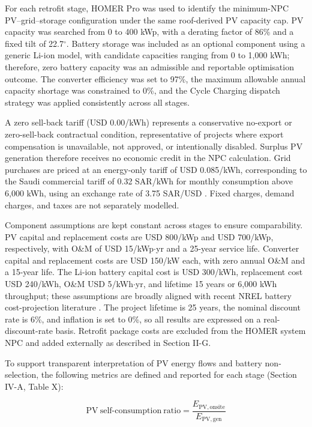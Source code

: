 \documentclass[journal,fleqn]{IEEEtran}
\begin{document}
For each retrofit stage, HOMER Pro \cite{ref25} was used to identify the minimum-NPC PV--grid--storage configuration under the same roof-derived PV capacity cap. PV capacity was searched from 0 to 400 kWp, with a derating factor of 86\% and a fixed tilt of 22.7$^{\circ}$. Battery storage was included as an optional component using a generic Li-ion model, with candidate capacities ranging from 0 to 1,000 kWh; therefore, zero battery capacity was an admissible and reportable optimisation outcome. The converter efficiency was set to 97\%, the maximum allowable annual capacity shortage was constrained to 0\%, and the Cycle Charging dispatch strategy was applied consistently across all stages.


A zero sell-back tariff (USD 0.00/kWh) represents a conservative no-export or zero-sell-back contractual condition, representative of projects where export compensation is unavailable, not approved, or intentionally disabled. Surplus PV generation therefore receives no economic credit in the NPC calculation. Grid purchases are priced at an energy-only tariff of USD 0.085/kWh, corresponding to the Saudi commercial tariff of 0.32 SAR/kWh for monthly consumption above 6,000 kWh, using an exchange rate of 3.75 SAR/USD \cite{ref26}. Fixed charges, demand charges, and taxes are not separately modelled.


Component assumptions are kept constant across stages to ensure comparability. PV capital and replacement costs are USD 800/kWp and USD 700/kWp, respectively, with O\&M of USD 15/kWp$\cdot$yr and a 25-year service life. Converter capital and replacement costs are USD 150/kW each, with zero annual O\&M and a 15-year life. The Li-ion battery capital cost is USD 300/kWh, replacement cost USD 240/kWh, O\&M USD 5/kWh$\cdot$yr, and lifetime 15 years or 6,000 kWh throughput; these assumptions are broadly aligned with recent NREL battery cost-projection literature \cite{ref27}. The project lifetime is 25 years, the nominal discount rate is 6\%, and inflation is set to 0\%, so all results are expressed on a real-discount-rate basis. Retrofit package costs are excluded from the HOMER system NPC and added externally as described in Section II-G.


To support transparent interpretation of PV energy flows and battery non-selection, the following metrics are defined and reported for each stage (Section IV-A, Table X):


\begin{equation}\label{eq:self-consumption}\mathrm{PV\ self\mbox{-}consumption\ ratio}=\frac{E_{\mathrm{PV,onsite}}}{E_{\mathrm{PV,gen}}}\end{equation}
\end{document}
